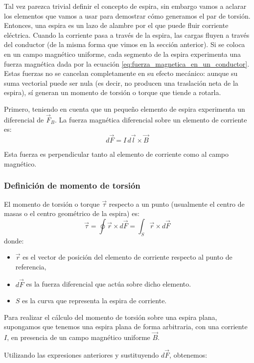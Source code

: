 Tal vez parezca trivial definir el concepto de espira, sin embargo vamos a aclarar los elementos que vamos a usar para demostrar cómo generamos el par de torsión. Entonces, una espira es un lazo de alambre por el que puede fluir corriente eléctrica. Cuando la corriente pasa a través de la espira, las cargas fluyen a través del conductor (de la misma forma que vimos en la sección anterior). Si se coloca en un campo magnético uniforme, cada segmento de la espira experimenta una fuerza magnética dada por la ecuación \eqref{eq:fuerza_magnetica_en_un_conductor}. Estas fuerzas no se cancelan completamente en su efecto mecánico: aunque su suma vectorial puede ser nula (es decir, no producen una traslación neta de la espira), sí generan un momento de torsión o torque que tiende a rotarla.

Primero, teniendo en cuenta que un pequeño elemento de espira experimenta un diferencial de \(\vec{F}_B\). La fuerza magnética diferencial sobre un elemento de corriente es:
\[
  d\vec{F} = I \, d\vec{l} \times \vec{B}
\]
\begin{tcolorbox}[myconclusion]
  Esta fuerza es perpendicular tanto al elemento de corriente como al campo magnético.
\end{tcolorbox}

\subsubsection{Definición de momento de torsión}

El momento de torsión o torque \(\vec{\tau}\) respecto a un punto (usualmente el centro de masas o el centro geométrico de la espira) es:
\[
\vec{\tau} = \oint \vec{r} \times d\vec{F} =\int_S \vec{r} \times d\vec{F}
\]
donde:
\begin{itemize}
  \item \(\vec{r}\) es el vector de posición del elemento de corriente respecto al punto de referencia,
  \item \(d\vec{F}\) es la fuerza diferencial que actúa sobre dicho elemento.
  \item \(S\) es la curva que representa la espira de corriente.
\end{itemize}

Para realizar el cálculo del momento de torsión sobre una espira plana, supongamos que tenemos una espira plana de forma arbitraria, con una corriente \(I\), en presencia de un campo magnético uniforme \(\vec{B}\).

Utilizando las expresiones anteriores y sustituyendo \(d\vec{F}\), obtenemos:

